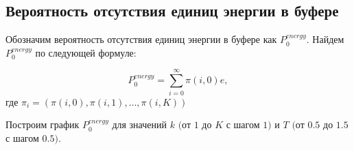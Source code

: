 \documentclass[12pt, a4paper]{article}
\begin{document}
\begin{figure}[h]
\end{figure}


	\subsection{Вероятность отсутствия единиц энергии в буфере}


Обозначим вероятность отсутствия единиц энергии в буфере как $P_0^{energy}$. Найдем $P_0^{energy}$ по следующей формуле:

$$P_0^{energy} = \sum\limits_{i = 0}^{\infty} \pi(i, 0)e,$$ где $\pi_i = (\pi(i, 0), \pi(i, 1), \ldots, \pi(i, K))$

Построим график $P_0^{energy}$ для значений $k$ $($от $1$ до $K$ с шагом $1)$ и  $T$ $($от $0.5$ до $1.5$  с шагом $0.5)$.
\end{document}
